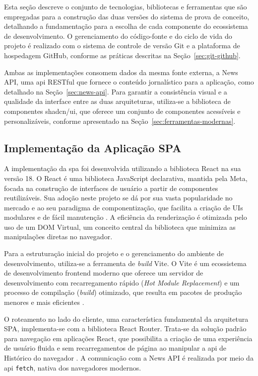Esta seção descreve o conjunto de tecnologias, bibliotecas e ferramentas que são empregadas para a construção das duas versões do sistema de prova de conceito, detalhando a fundamentação para a escolha de cada componente do ecossistema de desenvolvimento. O gerenciamento do código-fonte e do ciclo de vida do projeto é realizado com o sistema de controle de versão Git e a plataforma de hospedagem GitHub, conforme as práticas descritas na Seção~\ref{sec:git-github}.

Ambas as implementações consomem dados da mesma fonte externa, a News API, uma \acrshort{api} RESTful que fornece o conteúdo jornalístico para a aplicação, como detalhado na Seção~\ref{sec:news-api}. Para garantir a consistência visual e a qualidade da interface entre as duas arquiteturas, utiliza-se a biblioteca de componentes shadcn/ui, que oferece um conjunto de componentes acessíveis e personalizáveis, conforme apresentado na Seção~\ref{sec:ferramentas-modernas}.

\subsection{Implementação da Aplicação SPA}
\label{ssec:implementacao_spa}

A implementação da \acrfull{spa} foi desenvolvida utilizando a biblioteca React na sua versão 18. O React é uma biblioteca JavaScript declarativa, mantida pela Meta, focada na construção de interfaces de usuário a partir de componentes reutilizáveis. Sua adoção neste projeto se dá por sua vasta popularidade no mercado e ao seu paradigma de componentização, que facilita a criação de UIs modulares e de fácil manutenção \cite{react2025}. A eficiência da renderização é otimizada pelo uso de um DOM Virtual, um conceito central da biblioteca que minimiza as manipulações diretas no navegador.

Para a estruturação inicial do projeto e o gerenciamento do ambiente de desenvolvimento, utiliza-se a ferramenta de \textit{build} Vite. O Vite é um ecossistema de desenvolvimento frontend moderno que oferece um servidor de desenvolvimento com recarregamento rápido (\textit{Hot Module Replacement}) e um processo de compilação (\textit{build}) otimizado, que resulta em pacotes de produção menores e mais eficientes \cite{vite_docs}.

O roteamento no lado do cliente, uma característica fundamental da arquitetura SPA, implementa-se com a biblioteca React Router. Trata-se da solução padrão para navegação em aplicações React, que possibilita a criação de uma experiência de usuário fluida e sem recarregamentos de página ao manipular a \acrshort{api} de Histórico do navegador \cite{react_router_docs}. A comunicação com a News API é realizada por meio da \acrshort{api} \texttt{fetch}, nativa dos navegadores modernos.

